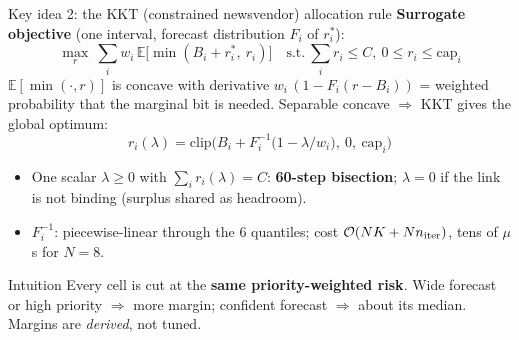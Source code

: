\documentclass[aspectratio=169,11pt,xcolor=table]{beamer}
\newcommand{\rstar}{r^{\ast}}
\begin{document}
\begin{frame}{Key idea 2: the KKT (constrained newsvendor) allocation rule}
  \small
  \textbf{Surrogate objective} (one interval, forecast distribution $F_i$ of $\rstar_i$):
  \[
    \max_{r}\ \sum_i w_i\,\mathbb{E}\big[\min(B_i + \rstar_i,\ r_i)\big]\quad \text{s.t.}\ \sum_i r_i \le C,\ 0\le r_i\le \mathrm{cap}_i
  \]
  $\mathbb{E}[\min(\cdot, r)]$ is concave with derivative $w_i\,(1 - F_i(r - B_i))$ = weighted probability that the marginal bit is needed. Separable concave $\Rightarrow$ KKT gives the global optimum:
  \[
    \boxed{\; r_i(\lambda) = \mathrm{clip}\Big(B_i + F_i^{-1}\big(1 - \lambda/w_i\big),\ 0,\ \mathrm{cap}_i\Big)\;}
  \]
  \begin{itemize}
    \item One scalar $\lambda \ge 0$ with $\sum_i r_i(\lambda) = C$: \textbf{60-step bisection}; $\lambda = 0$ if the link is not binding (surplus shared as headroom).
    \item $F_i^{-1}$: piecewise-linear through the 6 quantiles; cost $\mathcal{O}(NK + N n_{\rm iter})$, tens of $\mu$s for $N=8$.
  \end{itemize}
  \begin{exampleblock}{Intuition}
    Every cell is cut at the \textbf{same priority-weighted risk}. Wide forecast or high priority $\Rightarrow$ more margin; confident forecast $\Rightarrow$ about its median. Margins are \emph{derived}, not tuned.
  \end{exampleblock}
\end{frame}
\end{document}
